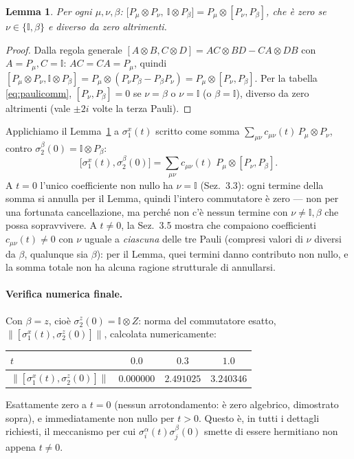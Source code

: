 \documentclass[11pt,a4paper]{article}
\newtheorem{lemma}{Lemma}
\begin{document}
\begin{lemma}
\label{lem:commgen}
Per ogni $\mu,\nu,\beta$: $\big[P_\mu\otimes P_\nu,\ \mathbb I\otimes P_\beta\big]
=P_\mu\otimes[P_\nu,P_\beta]$, che è zero se $\nu\in\{\mathbb I,\beta\}$ e diverso da zero
altrimenti.
\end{lemma}
\begin{proof}
Dalla regola generale $[A\otimes B,C\otimes D]=AC\otimes BD-CA\otimes DB$ con $A=P_\mu,C=\mathbb
I$: $AC=CA=P_\mu$, quindi $[P_\mu\otimes P_\nu,\mathbb I\otimes P_\beta]=P_\mu\otimes(P_\nu
P_\beta-P_\beta P_\nu)=P_\mu\otimes[P_\nu,P_\beta]$. Per la tabella \eqref{eq:paulicomm},
$[P_\nu,P_\beta]=0$ se $\nu=\beta$ o $\nu=\mathbb I$ (o $\beta=\mathbb I$), diverso da zero
altrimenti (vale $\pm2i$ volte la terza Pauli).
\end{proof}

Applichiamo il Lemma~\ref{lem:commgen} a $\sigma_1^x(t)$ scritto come somma
$\sum_{\mu\nu}c_{\mu\nu}(t)\,P_\mu\otimes P_\nu$, contro $\sigma_2^\beta(0)=\mathbb
I\otimes P_\beta$:
\begin{equation}
\big[\sigma_1^x(t),\sigma_2^\beta(0)\big]
=\sum_{\mu\nu}c_{\mu\nu}(t)\;P_\mu\otimes[P_\nu,P_\beta].
\end{equation}
A $t=0$ l'unico coefficiente non nullo ha $\nu=\mathbb I$ (Sez.~3.3): ogni termine della somma
si annulla per il Lemma, quindi l'intero commutatore è zero --- non per una fortunata
cancellazione, ma perché non c'è nessun termine con $\nu\neq\mathbb I,\beta$ che possa
sopravvivere. A $t\neq0$, la Sez.~3.5 mostra che compaiono coefficienti $c_{\mu\nu}(t)\neq0$
con $\nu$ uguale a \emph{ciascuna} delle tre Pauli (compresi valori di $\nu$ diversi da
$\beta$, qualunque sia $\beta$): per il Lemma, quei termini danno contributo non nullo, e la
somma totale non ha alcuna ragione strutturale di annullarsi.

\paragraph{Verifica numerica finale.} Con $\beta=z$, cioè $\sigma_2^z(0)=\mathbb I\otimes Z$:
norma del commutatore esatto, $\|[\sigma_1^x(t),\sigma_2^z(0)]\|$, calcolata numericamente:
\begin{center}
\begin{tabular}{lccc}
\toprule
$t$ & $0.0$ & $0.3$ & $1.0$\\
\midrule
$\|[\sigma_1^x(t),\sigma_2^z(0)]\|$ & $0.000000$ & $2.491025$ & $3.240346$\\
\bottomrule
\end{tabular}
\end{center}
Esattamente zero a $t=0$ (nessun arrotondamento: è zero algebrico, dimostrato sopra), e
immediatamente non nullo per $t>0$. Questo è, in tutti i dettagli richiesti, il meccanismo per
cui $\sigma_i^\alpha(t)\sigma_j^\beta(0)$ smette di essere hermitiano non appena $t\neq0$.
\end{document}
